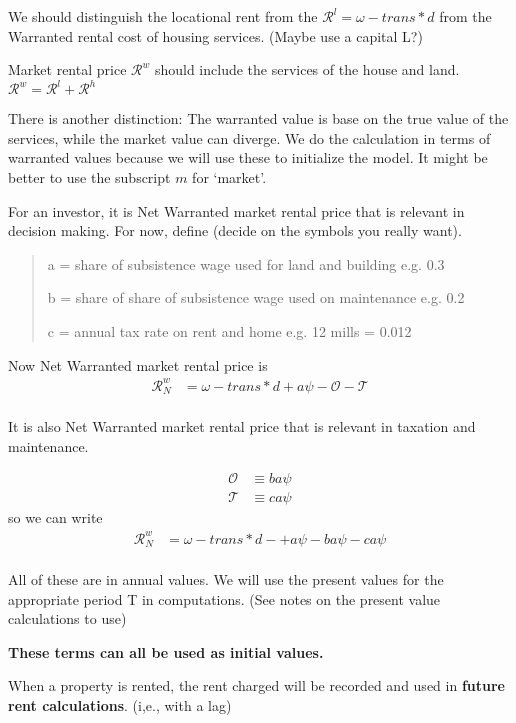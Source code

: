 We should distinguish the locational rent from the $\mathcal{R}^l = \omega - trans*d$ from the Warranted rental cost of housing services. (Maybe use a capital L?) 

Market  rental price $\mathcal{R}^w$ should  include the services of the house and land.  $\mathcal{R}^w =\mathcal{R}^l+\mathcal{R}^h$ 

There is another distinction: The warranted value is base on the true value of the services, while the market value can diverge. We do the calculation in terms of warranted values because we will use these to initialize the model. It might be better to use the subscript $m$ for `market'. 

For an investor, it is Net Warranted market  rental price that is relevant in decision making. For now, define (decide on the symbols you really want).
\begin{quotation}
a  =  share of subsistence wage  used for land and building e.g. 0.3

b  = share of share of subsistence wage  used on maintenance e.g. 0.2

c  = annual tax rate on rent and home  e.g. 12 mills = 0.012

\end{quotation}
Now Net Warranted market  rental price is
\begin{align}
\mathcal{R}_N^w &= \omega - trans*d + a\psi -  \mathcal{O} - \mathcal{T} \\
\end{align}

It is also Net Warranted market  rental price that is relevant in taxation and maintenance. 

\begin{align}
\mathcal{O} &\equiv  ba\psi\\%
 \mathcal{T} &\equiv ca\psi %
\end{align}
so we can write
 \begin{align}
\mathcal{R}_N^w &= \omega - trans*d- + a\psi -   ba\psi - ca\psi \\
\end{align}

All of these are in annual values. We will use the present values  for the appropriate period  T in computations. (See notes on the present value calculations to use)

\textbf{These terms can all be used as initial values.}

When a property is rented, the rent charged will be recorded and used in \textbf{future rent calculations}.   (i,e., with a lag)

